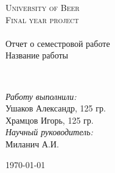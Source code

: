 \begin{titlepage}
\begin{center}


\textsc{\LARGE University of Beer}\\[1.5cm]

\textsc{\Large Final year project}\\[0.5cm]

\HRule \\[0.4cm]
{ \huge  Отчет о семестровой работе \\
Название работы
\\[0.4cm] }

\HRule \\[1.5cm]


\begin{flushright} \large
\emph{Работу выполнили:} \\
Ушаков Александр, 125 гр. \\
Храмцов Игорь, 125 гр. \\
\emph{Научный руководитель:} \\
Миланич А.И.
\end{flushright}


\vfill

{\large \today}

\end{center}
\end{titlepage}